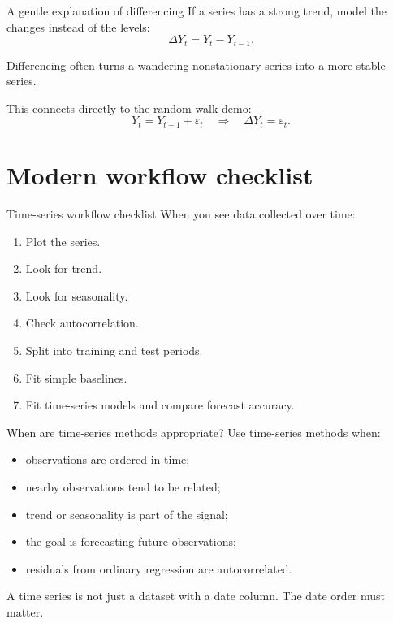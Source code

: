 \documentclass[aspectratio=169,11pt]{beamer}
\begin{document}
\begin{frame}{A gentle explanation of differencing}
If a series has a strong trend, model the changes instead of the levels:
\[
  \Delta Y_t = Y_t - Y_{t-1}.
\]

\vspace{0.3cm}
Differencing often turns a wandering nonstationary series into a more stable series.

\vspace{0.4cm}
This connects directly to the random-walk demo:
\[
  Y_t = Y_{t-1} + \varepsilon_t
  \quad \Rightarrow \quad
  \Delta Y_t = \varepsilon_t.
\]
\end{frame}

\section{Modern workflow checklist}

\begin{frame}{Time-series workflow checklist}
When you see data collected over time:

\begin{enumerate}
  \item Plot the series.
  \item Look for trend.
  \item Look for seasonality.
  \item Check autocorrelation.
  \item Split into training and test periods.
  \item Fit simple baselines.
  \item Fit time-series models and compare forecast accuracy.
\end{enumerate}
\end{frame}

\begin{frame}{When are time-series methods appropriate?}
Use time-series methods when:
\begin{itemize}
  \item observations are ordered in time;
  \item nearby observations tend to be related;
  \item trend or seasonality is part of the signal;
  \item the goal is forecasting future observations;
  \item residuals from ordinary regression are autocorrelated.
\end{itemize}

\vspace{0.4cm}
A time series is not just a dataset with a date column. The date order must matter.
\end{frame}
\end{document}
